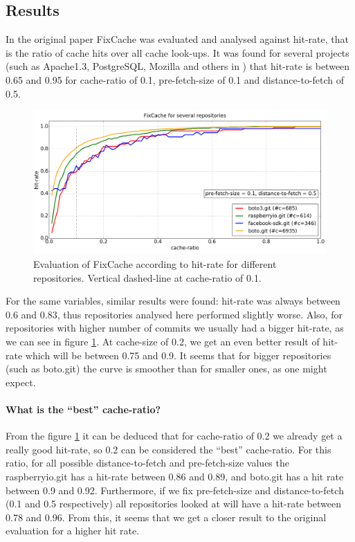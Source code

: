 \documentclass[12pt,twoside,notitlepage]{report}
\newcommand{\fxch}{FixCache}
\begin{document}
\subsection{Results}
In the original paper \fxch{} was evaluated and analysed against hit-rate, that is the ratio of cache hits over all cache look-ups. It was found for several projects (such as Apache1.3, PostgreSQL, Mozilla and others in \cite{FixCache}) that hit-rate is between 0.65 and 0.95 for cache-ratio of 0.1, pre-fetch-size of 0.1 and distance-to-fetch of 0.5.
\begin{figure}[h]
\includegraphics[width=1.0\textwidth]{plot_several.png}
\caption[Evaluation of \fxch{} according to hit-rate for different repositories.]{Evaluation of \fxch{} according to hit-rate for different repositories. Vertical dashed-line at cache-ratio of 0.1.}
\label{fig:v5_repos}
\end{figure}

For the same variables, similar results were found: hit-rate was always between 0.6 and 0.83, thus repositories analysed here performed slightly worse. Also, for repositories with higher number of commits we usually had a bigger hit-rate, as we can see in figure \ref{fig:v5_repos}. At cache-size of 0.2, we get an even better result of hit-rate which will be between 0.75 and 0.9. It seems that for bigger repositories (such as boto.git) the curve is smoother than for smaller ones, as one might expect.
\paragraph{What is the ``best'' cache-ratio?}From the figure \ref{fig:v5_repos} it can be deduced that for cache-ratio of 0.2 we already get a really good hit-rate, so 0.2 can be considered the ``best'' cache-ratio. For this ratio, for all possible distance-to-fetch and pre-fetch-size values the raspberryio.git has a hit-rate between 0.86 and 0.89, and boto.git has a hit rate between 0.9 and 0.92. Furthermore, if we fix pre-fetch-size and distance-to-fetch (0.1 and 0.5 respectively) all repositories looked at will have a hit-rate between 0.78 and 0.96. From this, it seems that we get a closer result to the original evaluation for a higher hit rate.
\end{document}
